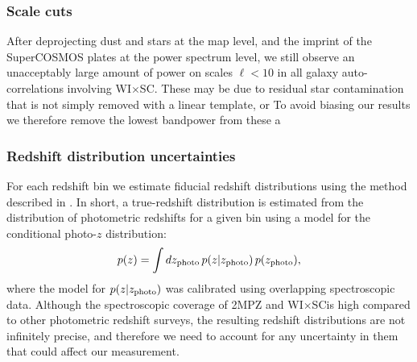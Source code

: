 \documentclass[useAMS,usenatbib]{mn2e}
\newcommand{\wisc}{WI$\times$SC}
\begin{document}
    \subsubsection{Scale cuts}\label{sssec:methods.syst.scales}
      After deprojecting dust and stars at the map level, and the imprint of the SuperCOSMOS plates at the power spectrum level, we still observe an unacceptably large amount of power on scales $\ell<10$ in all galaxy auto-correlations involving \wisc. These may be due to residual star contamination that is not simply removed with a linear template, or To avoid biasing our results we therefore remove the lowest bandpower from these a
      
    \subsubsection{Redshift distribution uncertainties}\label{sssec:methods.syst.photoz}
      For each redshift bin we estimate fiducial redshift distributions using the method described in \cite{2018MNRAS.481.1133P}. In short, a true-redshift distribution is estimated from the distribution of photometric redshifts for a given bin using a model for the conditional photo-$z$ distribution:
      \begin{equation}
        p(z)=\int dz_{\rm photo}\,p(z|z_{\rm photo})\,p(z_{\rm photo}),
      \end{equation}
      where the model for $p(z|z_{\rm photo})$ was calibrated using overlapping spectroscopic data. Although the spectroscopic coverage of 2MPZ and \wisc is high compared to other photometric redshift surveys, the resulting redshift distributions are not infinitely precise, and therefore we need to account for any uncertainty in them that could affect our measurement.
\end{document}
